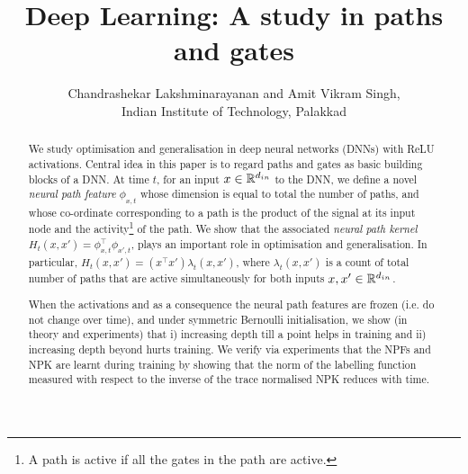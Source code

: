 \documentclass{article}
\title{Deep Learning: A study in paths and gates}
\author{Chandrashekar Lakshminarayanan and Amit Vikram Singh, \\ Indian Institute of Technology, Palakkad}
\begin{document}
\maketitle
\begin{abstract}
We study optimisation and generalisation in deep neural networks (DNNs) with ReLU activations. Central idea in this paper is to regard paths and gates as basic building blocks of a DNN. At time $t$, for an input $x\in\mathbb{R}^{d_{in}}$ to the DNN, we define a novel \emph{neural path feature} $\phi_{x,t}$ whose dimension is equal to total the number of paths, and whose co-ordinate corresponding to a path is the product of the signal at its input node  and the activity\footnote{A path is active if all the gates in the path are active.} of the path. We show that the associated \emph{neural path kernel} $H_t(x,x')=\phi^\top_{x,t}\phi_{x',t}$, plays an important role in optimisation and generalisation. In particular, $H_t(x,x')=(x^\top x')\lambda_t(x,x')$, where $\lambda_t(x,x')$ is a count of total number of paths that are active simultaneously for both inputs $x,x'\in \mathbb{R}^{d_{in}}$. 

When the activations and as a consequence the neural path features are frozen (i.e. do not change over time), and under symmetric Bernoulli initialisation, we show (in theory and experiments) that i) increasing depth till a point helps in training and ii) increasing depth beyond hurts training. We verify via experiments that the NPFs and NPK are learnt during training by showing that the norm of the labelling function measured with respect to the inverse of the trace normalised NPK reduces with time.

\end{abstract}
\end{document}
